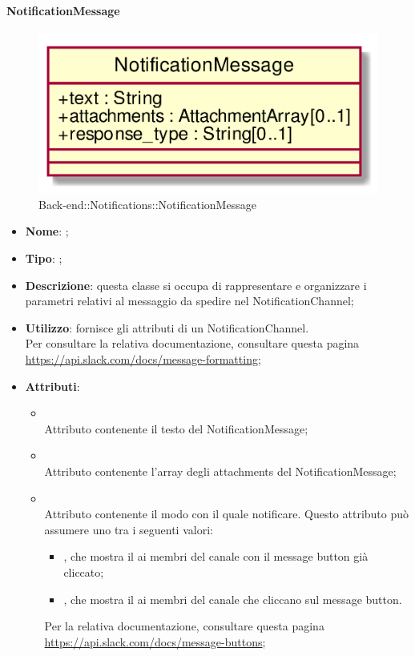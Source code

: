 \hypertarget{NotificationMessage_label}{\paragraph{NotificationMessage}}
\begin{figure}[h]
	\centering
	\includegraphics[width=\textwidth,height=\textheight,keepaspectratio]{images/ClassNotificationMessage.png}
	\caption{Back-end::Notifications::NotificationMessage}
\end{figure}
\begin{itemize}
	\item \textbf{Nome}: ;
	\item \textbf{Tipo}: ;
	\item \textbf{Descrizione}: questa classe si occupa di rappresentare e organizzare i parametri relativi al messaggio da spedire nel NotificationChannel;
	\item \textbf{Utilizzo}: fornisce gli attributi di un NotificationChannel. \\ Per consultare la relativa documentazione, consultare questa pagina \url{https://api.slack.com/docs/message-formatting};
	\item \textbf{Attributi}:
	\begin{itemize}
		\item[]  \\
		Attributo contenente il testo del NotificationMessage;
		\item[]  \\
		Attributo contenente l'array degli attachments del NotificationMessage;
		\item[]  \\
		Attributo contenente il modo con il quale notificare.
Questo attributo può assumere uno tra i seguenti valori:
\begin{itemize}
\item {}, che mostra il  ai membri del canale con il message button già cliccato;
\item {}, che mostra il  ai membri del canale che cliccano sul message button.
\end{itemize}
Per la relativa documentazione, consultare questa pagina \url{https://api.slack.com/docs/message-buttons};
	\end{itemize}
\end{itemize}
\FloatBarrier


